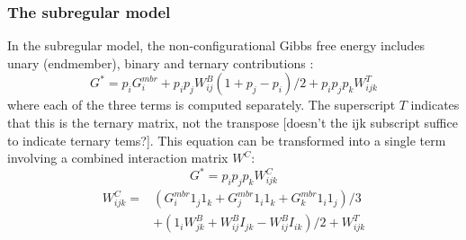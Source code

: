 \documentclass[preprint,12pt]{elsarticle}
\begin{document}
\subsubsection{The subregular model}
In the subregular model, the non-configurational Gibbs free energy includes unary (endmember), binary and ternary contributions \citep{HW1989}:
\begin{equation}
    G^* = p_i G^{mbr}_i + p_i p_j W_{ij}^B (1 + p_j - p_i)/2 + p_i p_j p_k W_{ijk}^T
\end{equation}
where each of the three terms is computed separately. The superscript $T$ indicates that this is the ternary matrix, not the transpose [doesn't the ijk subscript suffice to indicate ternary tems?]. This equation can be transformed into a single term involving a combined interaction matrix $W^C$:
\begin{equation}
    G^* = p_i p_j p_k W^C_{ijk}
\end{equation}  
\begin{equation}
    \begin{split}
        W^C_{ijk} =& (G^{mbr}_i 1_j 1_k + G^{mbr}_j 1_i 1_k + G^{mbr}_k 1_i 1_j)/3 \\
        &+ (1_iW_{jk}^B + W_{ij}^B I_{jk} - W_{ij}^B I_{ik})/2 + W_{ijk}^T
    \end{split}
\end{equation}
\end{document}

